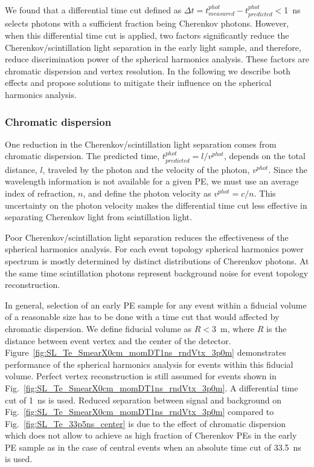 We found that a differential time cut defined as $\Delta t=t^{phot}_{measured} - t^{phot}_{predicted}<$1~ns selects photons with a 
sufficient fraction being Cherenkov photons. However, when this differential time cut is applied, two factors significantly reduce 
the Cherenkov/scintillation light separation in the early light sample, and therefore, reduce discrimination power of the spherical 
harmonics analysis. These factors are chromatic dispersion and vertex resolution. In the following we describe both effects and 
propose solutions to mitigate their influence on the spherical harmonics analysis.

\subsubsection{Chromatic dispersion}
One reduction in the Cherenkov/scintillation light separation comes from chromatic dispersion. The predicted time, 
$t^{phot}_{predicted}=l/v^{phot}$, depends on the total distance, $l$, traveled by the photon and the velocity of the photon, 
$v^{phot}$.  Since the wavelength information is not available for a given PE, we must use an average index of refraction, $n$, 
and define the photon velocity as $v^{phot} = c/n$. This uncertainty on the photon velocity makes the differential time cut less 
effective in separating Cherenkov light from scintillation light. 

Poor Cherenkov/scintillation light separation reduces the effectiveness of the spherical harmonics analysis. For each event topology 
spherical harmonics power spectrum is mostly determined by distinct distributions of Cherenkov photons. At the same time scintillation 
photons represent background noise for event topology reconstruction.

In general, selection of an early PE sample for any event within a fiducial volume of a reasonable size has to be done with a time
cut that would affected by chromatic dispersion. We define fiducial volume as $R<3$~m, where $R$ is the distance between event vertex 
and the center of the detector. Figure~\ref{fig:SL_Te_SmearX0cm_momDT1ns_rndVtx_3p0m} demonstrates performance of the spherical 
harmonics analysis for events within this fiducial volume. Perfect vertex reconstruction is still assumed for events shown in 
Fig.~\ref{fig:SL_Te_SmearX0cm_momDT1ns_rndVtx_3p0m}. A differential time cut of 1~ns is used.
Reduced separation between signal and background on Fig.~\ref{fig:SL_Te_SmearX0cm_momDT1ns_rndVtx_3p0m} compared to 
Fig.~\ref{fig:SL_Te_33p5ns_center} is due to the effect of chromatic dispersion which does not allow to achieve as high fraction of 
Cherenkov PEs in the early PE sample as in the case of central events when an absolute time cut of 33.5~ns is used.


